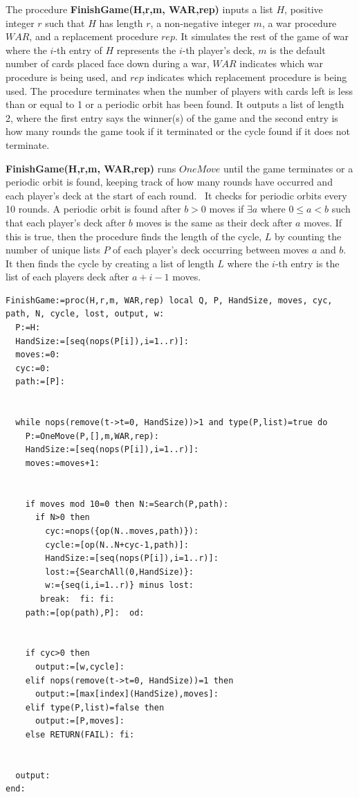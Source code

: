 \documentclass[12pt]{amsart}
\begin{document}
The procedure \textbf{FinishGame(H,r,m, WAR,rep)} inputs a list $H$, positive integer $r$ such that $H$ has length $r$, a non-negative integer $m$, a war procedure $WAR$, and a replacement procedure $rep$. It simulates the rest of the game of war where the $i$-th entry of $H$ represents the $i$-th player's deck, $m$ is the default number of cards placed face down during a war, $WAR$ indicates which war procedure is being used, and $rep$ indicates which replacement procedure is being used. The procedure terminates when the number of players with cards left is less than or equal to 1 or a periodic orbit has been found. It outputs a list of length 2, where the first entry says the winner(s) of the game and the second entry is how many rounds the game took if it terminated or the cycle found if it does not terminate.


\textbf{FinishGame(H,r,m, WAR,rep)} runs $OneMove$ until the game terminates or a periodic orbit is found, keeping track of how many rounds have occurred and each player's deck at the start of each round.  It checks for periodic orbits every 10 rounds. A periodic orbit is found after $b>0$ moves if $\exists a$ where $0\leq a < b$ such that each player's deck after $b$ moves is the same as their deck after $a$ moves. If this is true, then the procedure finds the length of the cycle, $L$ by counting the number of unique lists $P$ of each player's deck occurring between moves $a$ and $b$. It then finds the cycle by creating a list of length $L$ where the $i$-th entry is the list of each players deck after $a+i-1$ moves.


\begin{lstlisting}
FinishGame:=proc(H,r,m, WAR,rep) local Q, P, HandSize, moves, cyc, path, N, cycle, lost, output, w:
  P:=H:
  HandSize:=[seq(nops(P[i]),i=1..r)]: 
  moves:=0:
  cyc:=0:
  path:=[P]: 


  while nops(remove(t->t=0, HandSize))>1 and type(P,list)=true do
    P:=OneMove(P,[],m,WAR,rep):
    HandSize:=[seq(nops(P[i]),i=1..r)]:
    moves:=moves+1: 


    if moves mod 10=0 then N:=Search(P,path): 
      if N>0 then
        cyc:=nops({op(N..moves,path)}):
        cycle:=[op(N..N+cyc-1,path)]:
        HandSize:=[seq(nops(P[i]),i=1..r)]:
        lost:={SearchAll(0,HandSize)}:
        w:={seq(i,i=1..r)} minus lost:
       break:  fi: fi: 
    path:=[op(path),P]:  od:


    if cyc>0 then
      output:=[w,cycle]:
    elif nops(remove(t->t=0, HandSize))=1 then
      output:=[max[index](HandSize),moves]:
    elif type(P,list)=false then
      output:=[P,moves]:
    else RETURN(FAIL): fi: 


  output:
end:
\end{lstlisting}
\end{document}
